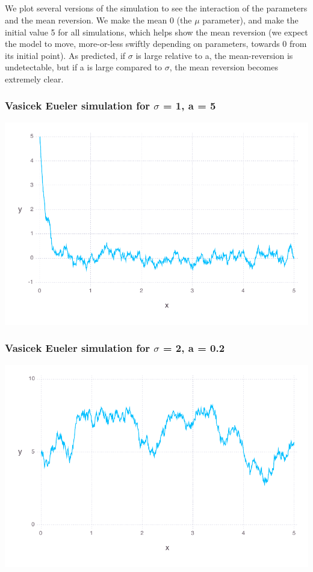 \documentclass[a4paper,12pt]{article}
\begin{document}
\subsection{}
We plot several versions of the simulation to see the interaction of the parameters and the mean reversion. We make the mean 0 (the $\mu$ parameter), and make the initial value 5 for all simulations, which helps show the mean reversion (we expect the model to move, more-or-less swiftly depending on parameters, towards 0 from its initial point). As predicted, if $\sigma$ is large relative to a, the mean-reversion is undetectable, but if a is large compared to $\sigma$, the mean reversion becomes extremely clear.

\subsubsection{Vasicek Eueler simulation for $\sigma$ = 1, a = 5}
\includegraphics[width=\linewidth]{figures/problemset_5_1.pdf}



\subsubsection{Vasicek Eueler simulation for $\sigma$ = 2, a = 0.2}
\includegraphics[width=\linewidth]{figures/problemset_6_1.pdf}
\end{document}
